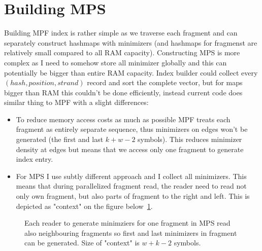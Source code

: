 \section{Building MPS}
\label{sec:index-construction}

Building MPF index is rather simple as we traverse each fragment and can separately construct hashmaps with minimizers (and hashmaps for fragmenst are relatively
small compared to all RAM capacity).
Constructing MPS is more complex as I need to somehow store all minimizer globally and this can potentially be bigger than entire RAM capacity.
Index builder could collect every $(hash,position,strand)$ record and
sort the complete vector, but for maps bigger than RAM this couldn't be done efficiently, instead current code does similar thing to MPF with a slight differences:
\begin{itemize}
  \item To reduce memory access costs as much as possible MPF treats each fragment as entirely separate sequence, thus minimizers on edges won't be generated (the first and last $k+w-2$ symbols). 
  This reduces minimizer density at edges but means that we access only one fragment to generate index entry.
  \item For MPS I use subtly different approach and I collect all minimizers. This means that during parallelized fragment read, the reader need to read not only own fragment, but also 
  parts of fragment to the right and left. This is depicted as "context" on the figure below~\ref{fig:index-build-halos}.
\end{itemize}

\begin{figure}[htbp]
\centering
{}
\caption{Each reader to generate minimziers for one fragment in MPS read also neighbouring fragments so first and last minimizers in fragment
can be generated. Size of "context" is $w+k-2$ symbols.}
\label{fig:index-build-halos}
\end{figure}

